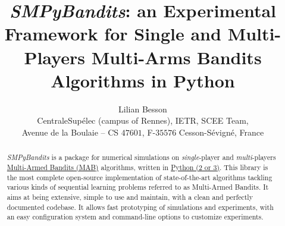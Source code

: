 \documentclass[a4paper,10pt,]{article}
\begin{document}
\title{\emph{SMPyBandits}: an Experimental Framework for Single and Multi-Players Multi-Arms Bandits Algorithms in Python}


\author{\name Lilian Besson  \\
        \addr CentraleSup\'elec (campus of Rennes), IETR, SCEE Team,\\
        Avenue de la Boulaie -- CS $47601$, F-$35576$ Cesson-S\'evign\'e, France
}



\maketitle

\vspace*{10pt}

\begin{abstract}%
  \emph{SMPyBandits} is a package for numerical simulations on
  \emph{single}-player and \emph{multi}-players
  \href{https://en.wikipedia.org/wiki/Multi-armed_bandit}{Multi-Armed
  Bandits (MAB)} algorithms, written in
  \href{https://www.python.org/}{Python (2 or 3)}.
  This library is the most complete open-source implementation of
  state-of-the-art algorithms tackling various kinds of sequential
  learning problems referred to as Multi-Armed Bandits. It aims at being
  extensive, simple to use and maintain, with a clean and perfectly
  documented codebase. It allows fast prototyping of simulations and
  experiments, with an easy configuration system and command-line options
  to customize experiments.
\end{abstract}
\end{document}
